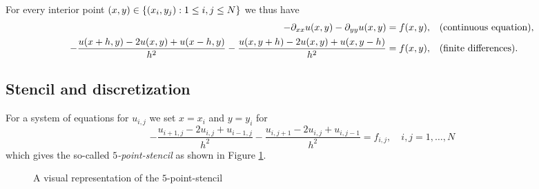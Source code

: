 For every interior point \(\parentheses*{x, y} \in \braces*{\parentheses*{x_i, y_j} : 1 \le i, j \le N}\) we thus have
\begin{align*}
	-\partial_{xx}u\parentheses*{x, y} - \partial_{yy}u\parentheses*{x, y} &= f\parentheses*{x, y}, && \text{(continuous equation)},\\
	-\frac{u\parentheses*{x + h, y} - 2u\parentheses*{x, y} + u\parentheses*{x - h, y}}{h^2} - \frac{u\parentheses*{x, y + h} - 2u\parentheses*{x, y} + u\parentheses*{x, y - h}}{h^2} &= f\parentheses*{x, y}, && \text{(finite differences)}.
\end{align*}


\subsection{Stencil and discretization}

For a system of equations for \(u_{i, j}\) we set \(x = x_i\) and \(y = y_i\) for
\[
	-\frac{u_{i + 1, j} - 2u_{i, j} + u_{i - 1, j}}{h^2} - \frac{u_{i, j + 1} - 2u_{i, j} + u_{i, j - 1}}{h^2} = f_{i, j}, \quad i, j = 1, \ldots, N
\]
which gives the so-called \emph{\(5\)-point-stencil} as shown in Figure \ref{fig:1-1}.

\begin{figure}[h]
	\centering
	\caption{A visual representation of the \(5\)-point-stencil}
	\label{fig:1-1}
\end{figure}

